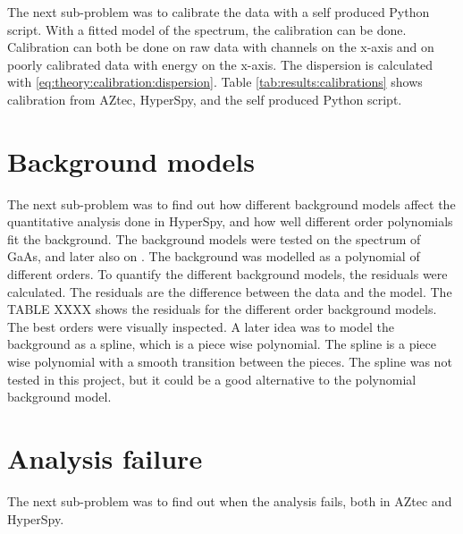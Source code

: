 The next sub-problem was to calibrate the data with a self produced Python script.
With a fitted model of the spectrum, the calibration can be done.
Calibration can both be done on raw data with channels on the x-axis and on poorly calibrated data with energy on the x-axis.
The dispersion is calculated with \cref{eq:theory:calibration:dispersion}.
Table \cref{tab:results:calibrations} shows calibration from AZtec, HyperSpy, and the self produced Python script.



%
%
\section{Background models}
\label{sec:discussion:background}

The next sub-problem was to find out how different background models affect the quantitative analysis done in HyperSpy, and how well different order polynomials fit the background.
The background models were tested on the spectrum of GaAs, and later also on .
The background was modelled as a polynomial of different orders.
To quantify the different background models, the residuals were calculated.
The residuals are the difference between the data and the model.
The TABLE XXXX  shows the residuals for the different order background models.
The best orders were visually inspected.
A later idea was to model the background as a spline, which is a piece wise polynomial.
The spline is a piece wise polynomial with a smooth transition between the pieces.
The spline was not tested in this project, but it could be a good alternative to the polynomial background model.



%
%
\section{Analysis failure}
\label{sec:discussion:failure}

The next sub-problem was to find out when the analysis fails, both in AZtec and HyperSpy.


